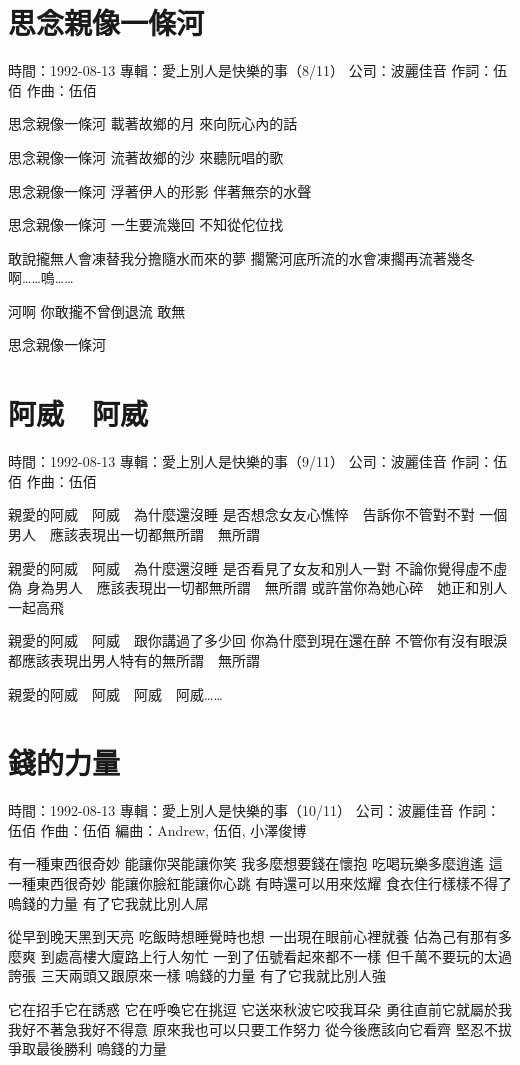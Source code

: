 \documentclass[UTF8,a4paper,oneside,twocolumn,12pt]{ctexbook}
\newcommand{\infopair}[2]{\textbullet #1：#2}
\newcommand{\zc}[1][伍佰]{\infopair{作詞}{#1}}
\newcommand{\zq}[1][伍佰]{\infopair{作曲}{#1}}
\newcommand{\bq}[1][伍佰]{\infopair{編曲}{#1}}
\newcommand{\zj}[1]{\infopair{專輯}{#1}}
\newcommand{\sj}[1]{\infopair{時間}{#1}}
\newcommand{\gs}[1]{\infopair{公司}{#1}}
\newenvironment{info}{\begin{flushleft}\kaishu
	}
	{\end{flushleft}\normalsize\yahei\par}
\newenvironment{lyric}{
	}
{}
\begin{document}
\section{思念親像一條河}
\begin{info}
	\sj{1992-08-13}
	\zj{愛上別人是快樂的事（8/11）}
	\gs{波麗佳音}
	\zc
	\zq
\end{info}
\begin{lyric}
	思念親像一條河
	載著故鄉的月
	來向阮心內的話

	思念親像一條河
	流著故鄉的沙
	來聽阮唱的歌

	思念親像一條河
	浮著伊人的形影
	伴著無奈的水聲

	思念親像一條河
	一生要流幾回
	不知從佗位找

	敢說攏無人會凍替我分擔隨水而來的夢
	擱驚河底所流的水會凍擱再流著幾冬
	啊……嗚……

	河啊
	你敢攏不曾倒退流
	敢無

	思念親像一條河
\end{lyric}

\section{阿威　阿威}
\begin{info}
	\sj{1992-08-13}
	\zj{愛上別人是快樂的事（9/11）}
	\gs{波麗佳音}
	\zc
	\zq
\end{info}
\begin{lyric}
	親愛的阿威　阿威　為什麼還沒睡
	是否想念女友心憔悴　告訴你不管對不對
	一個男人　應該表現出一切都無所謂　無所謂

	親愛的阿威　阿威　為什麼還沒睡
	是否看見了女友和別人一對
	不論你覺得虛不虛偽
	身為男人　應該表現出一切都無所謂　無所謂
	或許當你為她心碎　她正和別人一起高飛

	親愛的阿威　阿威　跟你講過了多少回
	你為什麼到現在還在醉
	不管你有沒有眼淚
	都應該表現出男人特有的無所謂　無所謂

	親愛的阿威　阿威　阿威　阿威……
\end{lyric}

\section{錢的力量}
\begin{info}
	\sj{1992-08-13}
	\zj{愛上別人是快樂的事（10/11）}
	\gs{波麗佳音}
	\zc
	\zq
	\bq[Andrew, 伍佰, 小澤俊博]
\end{info}
\begin{lyric}
	有一種東西很奇妙
	能讓你哭能讓你笑
	我多麼想要錢在懷抱
	吃喝玩樂多麼逍遙
	這一種東西很奇妙
	能讓你臉紅能讓你心跳
	有時還可以用來炫耀
	食衣住行樣樣不得了
	嗚錢的力量
	有了它我就比別人屌

	從早到晚天黑到天亮
	吃飯時想睡覺時也想
	一出現在眼前心裡就養
	佔為己有那有多麼爽
	到處高樓大廈路上行人匆忙
	一到了伍號看起來都不一樣
	但千萬不要玩的太過誇張
	三天兩頭又跟原來一樣
	嗚錢的力量
	有了它我就比別人強

	它在招手它在誘惑
	它在呼喚它在挑逗
	它送來秋波它咬我耳朵
	勇往直前它就屬於我
	我好不著急我好不得意
	原來我也可以只要工作努力
	從今後應該向它看齊
	堅忍不拔爭取最後勝利
	嗚錢的力量
\end{lyric}
\end{document}
